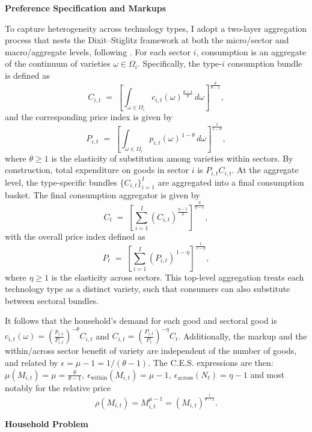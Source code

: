 \documentclass[a4paper,12pt]{article} %
\numberwithin{equation}{section} %
\numberwithin{figure}{section}
\numberwithin{table}{section}
\begin{document}
\medskip
\medskip
\noindent\textbf{Preference Specification and Markups}
\medskip

To capture heterogeneity across technology types, I adopt a two-layer aggregation process that nests the Dixit--Stiglitz framework at both 
the micro/sector and macro/aggregate levels, following \textcite{carvalho2021sectoral}. For each sector $i$, consumption is an aggregate of the
continuum of varieties \(\omega \in \Omega_i\). Specifically, the type-\(i\) consumption bundle is defined as
\[
C_{i,t} \;=\; \left[ \int_{\omega \in \Omega_i} c_{i,t}(\omega)^{\frac{\theta-1}{\theta}}\,d\omega \right]^{\frac{\theta}{\theta-1}},
\]
and the corresponding price index is given by
\[
P_{i,t} \;=\; \left[ \int_{\omega \in \Omega_i} p_{i,t}(\omega)^{\,1-\theta}\,d\omega \right]^{\frac{1}{1-\theta}},
\]
where \(\theta \ge 1\) is the elasticity of substitution among varieties within sectors. By construction, total expenditure on goods in 
sector \(i\) is \(P_{i,t}C_{i,t}\). At the aggregate level, the type-specific bundles \(\{C_{i,t}\}_{i=1}^I\) are 
aggregated into a final consumption basket. The final consumption aggregator is given by
\[
C_t \;=\; \left[ \sum_{i=1}^I \left( C_{i,t} \right)^{\frac{\eta-1}{\eta}} \right]^{\frac{\eta}{\eta-1}},
\]
with the overall price index defined as
\[
P_t \;=\; \left[ \sum_{i=1}^I \left( P_{i,t} \right)^{\,1-\eta} \right]^{\frac{1}{1-\eta}},
\]
where $\eta \ge 1$ is the elasticity across sectors. This top-level aggregation treats each technology type as a distinct variety, 
such that consumers can also substitute between sectoral bundles.

It follows that the household's demand for each good and sectoral good is 
$c_{i,t}(\omega) = \left(\frac{p_{i,t}}{P_{i,t}}\right)^{-\theta}C_{i,t}$ and 
$C_{i,t} = \left(\frac{P_{i,t}}{P_t}\right)^{-\eta}C_t$. Additionally, the markup and the within/across sector benefit of variety are 
independent of the number of goods, and related by $\epsilon = \mu -1 = 1/ (\theta-1)$. The C.E.S. expressions are then: 
$\mu(M_{i,t}) = \mu = \frac{\theta}{\theta - 1}, 
\   \epsilon_{\text{within}}(M_{i,t}) = \mu - 1 , \ \epsilon_{\text{across}}(N_{t}) = \eta - 1$ and most notably for the relative price
\begin{equation}
  \rho(M_{i,t}) = M_{i,t}^{\mu - 1} = \left(M_{i,t}\right)^{\frac{1}{\theta - 1}}. \label{eq:lovevariety}
\end{equation}

\medskip
\medskip
\noindent\textbf{Household Problem}
\medskip
\end{document}
